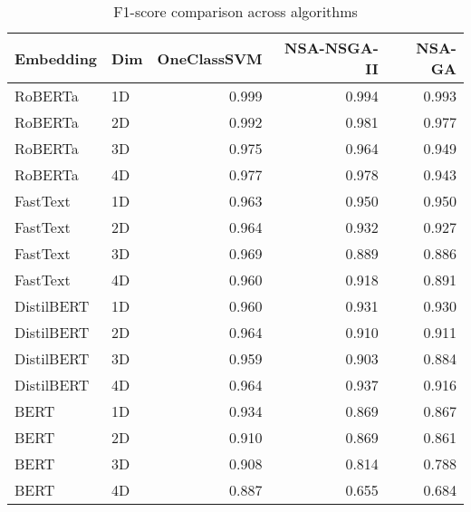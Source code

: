\begin{table}[h]
    \centering
    \begin{tabular}{llrrr}
\toprule
Embedding & Dim & OneClassSVM & NSA-NSGA-II & NSA-GA \\
\midrule
RoBERTa & 1D & 0.999 & 0.994 & 0.993 \\
RoBERTa & 2D & 0.992 & 0.981 & 0.977 \\
RoBERTa & 3D & 0.975 & 0.964 & 0.949 \\
RoBERTa & 4D & 0.977 & 0.978 & 0.943 \\
FastText & 1D & 0.963 & 0.950 & 0.950 \\
FastText & 2D & 0.964 & 0.932 & 0.927 \\
FastText & 3D & 0.969 & 0.889 & 0.886 \\
FastText & 4D & 0.960 & 0.918 & 0.891 \\
DistilBERT & 1D & 0.960 & 0.931 & 0.930 \\
DistilBERT & 2D & 0.964 & 0.910 & 0.911 \\
DistilBERT & 3D & 0.959 & 0.903 & 0.884 \\
DistilBERT & 4D & 0.964 & 0.937 & 0.916 \\
BERT & 1D & 0.934 & 0.869 & 0.867 \\
BERT & 2D & 0.910 & 0.869 & 0.861 \\
BERT & 3D & 0.908 & 0.814 & 0.788 \\
BERT & 4D & 0.887 & 0.655 & 0.684 \\
\bottomrule
\end{tabular}
    \caption{F1-score comparison across algorithms}
    \label{tab:f1_comparison}
\end{table}
